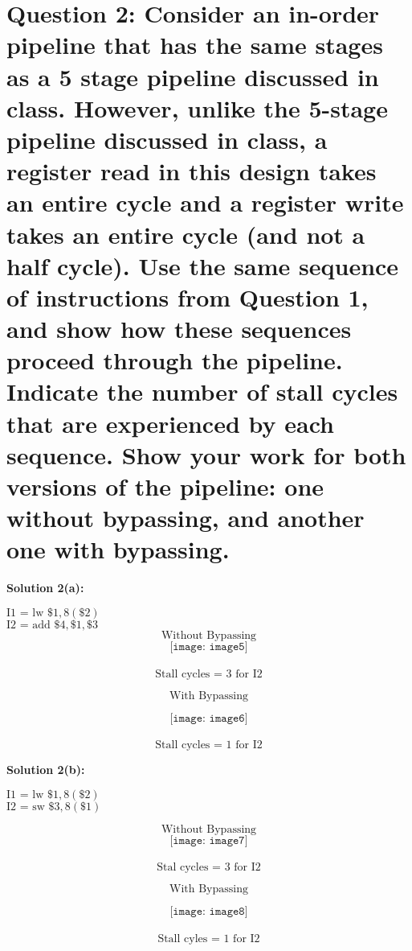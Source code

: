\documentclass[11pt]{article}
\begin{document}
\section*{Question 2: Consider an in-order pipeline that has the same stages as a 5 stage pipeline discussed in class. However, unlike the 5-stage pipeline discussed in class, a register read in this design takes an entire cycle and a register write takes an entire cycle (and not a half cycle).
Use the same sequence of instructions from Question 1, and show how these sequences proceed through the pipeline. Indicate the number of stall cycles that are experienced by each sequence. Show your work for both versions of the pipeline: one without bypassing, and another one with bypassing. }
\textbf{Solution 2(a): }  

$\text{I1 = lw } \$1, 8(\$2) $ \\
$\text{I2 = add } \$4, \$1, \$3$
\newline 
\[\text{Without Bypassing}\]
\[\texttt{[image: image5]}\] \\
\[\text{Stall cycles = 3 for I2}\]

\newline 
\[\text{With Bypassing}\]

\[\texttt{[image: image6]}\] \\
\[\text{Stall cycles = 1 for I2}\]

\textbf{Solution 2(b): } 

$\text{I1 = lw } \$1, 8(\$2) $\\
$ \text{I2 = sw } \$3, 8(\$1) $

\newline 
\[\text{Without Bypassing}\]
\[\texttt{[image: image7]}\] \\
\[\text{Stal cycles = 3 for I2}\]

\newline 
\[\text{With Bypassing}\]

\[\texttt{[image: image8]}\]  \\
\[\text{Stall cyles = 1 for I2}\]
\end{document}
